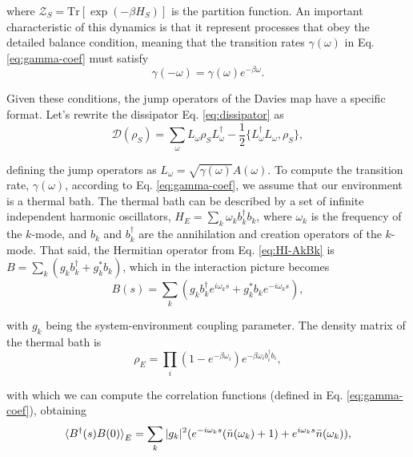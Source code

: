 \noindent where $\mathcal{Z}_S = \text{Tr}[\exp(-\beta {H}_S)]$ is the partition function. An important characteristic of this dynamics is that it represent processes that obey the detailed balance condition, meaning that the transition rates $\gamma (\omega)$ in Eq. \eqref{eq:gamma-coef} must satisfy
\begin{equation}
    \gamma(-\omega) = \gamma (\omega) e^{-\beta \omega}.
    \label{eq:detailed-balance}
\end{equation}

\noindent Given these conditions, the jump operators of the Davies map have a specific format. Let's rewrite the dissipator Eq. \eqref{eq:dissipator} as
\begin{equation}
    \mathcal{D}({\rho}_S) = \sum_\omega {L}_\omega {\rho}_S {L}_\omega^\dagger - \frac{1}{2} \{ {L}_\omega^\dagger {L}_\omega , {\rho}_S \},
    \label{eq:dissipator-L}
\end{equation}

\noindent defining the jump operators as ${L}_\omega = \sqrt{\gamma (\omega)} {A}(\omega)$. To compute the transition rate, $\gamma (\omega)$, according to Eq. \eqref{eq:gamma-coef}, we assume that our environment is a thermal bath. The thermal bath can be described by a set of infinite independent harmonic oscillators, ${H}_E = \sum_k \omega_k {b}_k^\dagger {b}_k$, where $\omega_k$ is the frequency of the $k$-mode, and ${b}_k$ and ${b}_k^\dagger$ are the annihilation and creation operators of the $k$-mode. That said, the Hermitian operator from Eq. \eqref{eq:HI-AkBk} is ${B} = \sum_k (g_k {b}_k^\dagger + g_k^* {b}_k)$, which in the interaction picture becomes
\begin{equation}
    {B} (s) = \sum_k (g_k {b}_k^\dagger e^{i \omega_k s} + g_k^* {b}_k e^{-i \omega_k s}),
\end{equation}

\noindent with $g_k$ being the system-environment coupling parameter. The density matrix of the thermal bath is 
\begin{equation}
    {\rho}_E = \prod_i (1- e^{-\beta \omega_i}) e^{-\beta \omega_i {b}_i^\dagger {b}_i},
\end{equation}

\noindent with which we can compute the correlation functions (defined in Eq. \eqref{eq:gamma-coef}), obtaining
\begin{equation}
    \braket{{B}^\dagger (s) {B} (0)}_E = \sum_k |g_k|^2 ( e^{-i \omega_k s} (\bar{n}(\omega_k) +1) + e^{i \omega_k s} \bar{n}(\omega_k)),
\end{equation}

